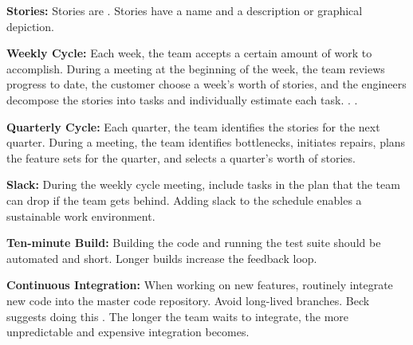 \textbf{Stories:} Stories are   \cite{BeckExtremeProgramming2004}. Stories have a name and a description or graphical depiction. 




\textbf{Weekly Cycle:} Each week, the team accepts a certain amount of work to accomplish. During a meeting at the beginning of the week, the team reviews progress to date, the customer choose a week's worth of stories, and the engineers decompose the stories into tasks and individually estimate each task.   \cite{BeckExtremeProgramming2004}.  \cite{BeckExtremeProgramming2004}. 






\textbf{Quarterly Cycle:} Each quarter, the team identifies the stories for the next quarter.  During a meeting, the team identifies bottlenecks, initiates repairs, plans the feature sets for the quarter, and selects a quarter's worth of stories. 




\textbf{Slack:} During the weekly cycle meeting, include tasks in the plan that the team can drop if the team gets behind. Adding slack to the schedule enables a sustainable work environment.


\textbf{Ten-minute Build:} Building the code and running the test suite should be automated and short. Longer builds increase the feedback loop. 


\textbf{Continuous Integration:} When working on new features, routinely integrate new code into the master code repository. Avoid long-lived branches. Beck suggests doing this   \cite{BeckExtremeProgramming2004}.  The longer the team waits to integrate, the more unpredictable and expensive integration becomes. 


